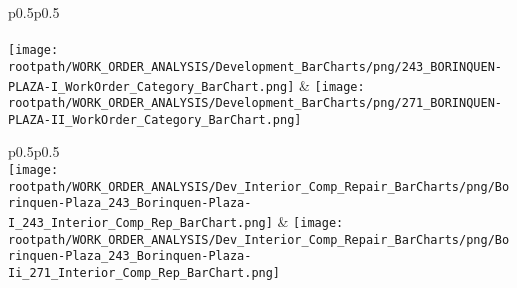 \begin{center}
                                \tablehead{\hspace{1cm}\\}
                                \tabletail{\hspace{1cm}\\}
                                \begin{supertabular}{p{0.5\textwidth}p{0.5\textwidth}}
                                \shrinkheight{1in}
                                 \\
                                 \\
                                \texttt{[image: \\rootpath/WORK\_ORDER\_ANALYSIS/Development\_BarCharts/png/243\_BORINQUEN-PLAZA-I\_WorkOrder\_Category\_BarChart.png]} & \texttt{[image: \\rootpath/WORK\_ORDER\_ANALYSIS/Development\_BarCharts/png/271\_BORINQUEN-PLAZA-II\_WorkOrder\_Category\_BarChart.png]} \\
                                        \end{supertabular}
\end{center}

                        \begin{center}
                        \tablehead{\hspace{1cm}\\}
                        \tabletail{\hspace{1cm}\\}
                        \begin{supertabular}{p{0.5\textwidth}p{0.5\textwidth}}
                         \\
                        \texttt{[image: \\rootpath/WORK\_ORDER\_ANALYSIS/Dev\_Interior\_Comp\_Repair\_BarCharts/png/Borinquen-Plaza\_243\_Borinquen-Plaza-I\_243\_Interior\_Comp\_Rep\_BarChart.png]} & \texttt{[image: \\rootpath/WORK\_ORDER\_ANALYSIS/Dev\_Interior\_Comp\_Repair\_BarCharts/png/Borinquen-Plaza\_243\_Borinquen-Plaza-Ii\_271\_Interior\_Comp\_Rep\_BarChart.png]} \\
                                         \\
\end{supertabular}
\end{center}

